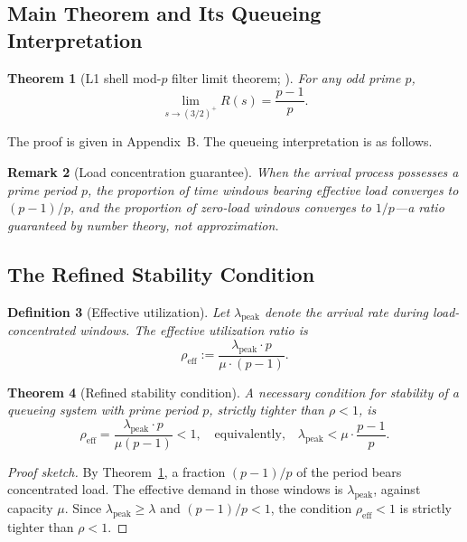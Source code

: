 \documentclass[12pt]{article}
\newtheorem{theorem}{Theorem}[section]
\newtheorem{definition}[theorem]{Definition}
\newtheorem{remark}[theorem]{Remark}
\newcommand{\rhoeff}{\rho_{\mathrm{eff}}}
\newcommand{\lpeak}{\lambda_{\mathrm{peak}}}
\begin{document}
\subsection{Main Theorem and Its Queueing Interpretation}

\begin{theorem}[L1 shell mod-$p$ filter limit theorem; \citealt{Moriwaki2026b}]
\label{thm:main}
  For any odd prime $p$,
  \[
    \lim_{s \to (3/2)^+} R(s) = \frac{p-1}{p}.
  \]
\end{theorem}

The proof is given in Appendix~B. The queueing interpretation is as follows.

\begin{remark}[Load concentration guarantee]
  When the arrival process possesses a prime period $p$, the proportion 
  of time windows bearing effective load converges to $(p-1)/p$, and the 
  proportion of zero-load windows converges to $1/p$---a ratio guaranteed 
  by number theory, not approximation.
\end{remark}

\subsection{The Refined Stability Condition}

\begin{definition}[Effective utilization]
  Let $\lpeak$ denote the arrival rate during load-concentrated windows. 
  The \emph{effective utilization ratio} is
  \[
    \rhoeff := \frac{\lpeak \cdot p}{\mu \cdot (p-1)}.
  \]
\end{definition}

\begin{theorem}[Refined stability condition]
\label{thm:refined}
  A necessary condition for stability of a queueing system with prime 
  period $p$, strictly tighter than $\rho < 1$, is
  \[
    \rhoeff = \frac{\lpeak \cdot p}{\mu(p-1)} < 1,
    \quad \text{equivalently,} \quad
    \lpeak < \mu \cdot \frac{p-1}{p}.
  \]
\end{theorem}

\begin{proof}[Proof sketch]
  By Theorem~\ref{thm:main}, a fraction $(p-1)/p$ of the period bears 
  concentrated load. The effective demand in those windows is $\lpeak$, 
  against capacity $\mu$. Since $\lpeak \geq \lambda$ and $(p-1)/p < 1$, 
  the condition $\rhoeff < 1$ is strictly tighter than $\rho < 1$.
\end{proof}
\end{document}
